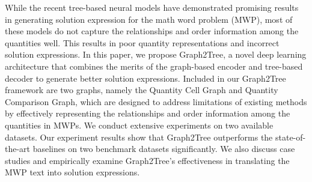 While the recent tree-based neural models have demonstrated promising results in generating solution expression for the math word problem (MWP), most of these models do not capture the relationships and order information among the quantities well. This results in poor quantity representations and incorrect solution expressions. In this paper, we propose Graph2Tree, a novel deep learning architecture that combines the merits of the graph-based encoder and tree-based decoder to generate better solution expressions. Included in our Graph2Tree framework are two graphs, namely the Quantity Cell Graph and Quantity Comparison Graph, which are designed to address limitations of existing methods by effectively representing the relationships and order information among the quantities in MWPs. We conduct extensive experiments on two available datasets. Our experiment results show that Graph2Tree outperforms the state-of-the-art baselines on two benchmark datasets significantly. We also discuss case studies and empirically examine Graph2Tree's effectiveness in translating the MWP text into solution expressions.
